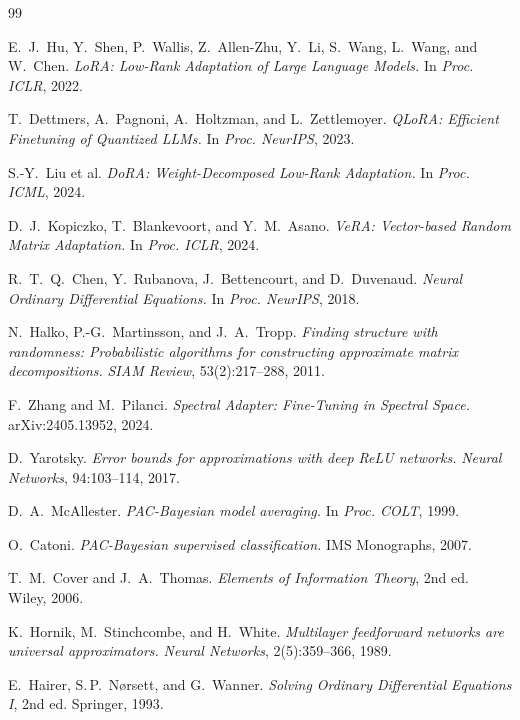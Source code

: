 \documentclass{scpe}
\begin{document}

\begin{thebibliography}{99}

E.~J.~Hu, Y.~Shen, P.~Wallis, Z.~Allen-Zhu, Y.~Li, S.~Wang, L.~Wang, and W.~Chen.
\textit{LoRA: Low-Rank Adaptation of Large Language Models.}
In \textit{Proc. ICLR}, 2022.

T.~Dettmers, A.~Pagnoni, A.~Holtzman, and L.~Zettlemoyer.
\textit{QLoRA: Efficient Finetuning of Quantized LLMs.}
In \textit{Proc. NeurIPS}, 2023.

S.-Y.~Liu et al.
\textit{DoRA: Weight-Decomposed Low-Rank Adaptation.}
In \textit{Proc. ICML}, 2024.

D.~J.~Kopiczko, T.~Blankevoort, and Y.~M.~Asano.
\textit{VeRA: Vector-based Random Matrix Adaptation.}
In \textit{Proc. ICLR}, 2024.

R.~T.~Q.~Chen, Y.~Rubanova, J.~Bettencourt, and D.~Duvenaud.
\textit{Neural Ordinary Differential Equations.}
In \textit{Proc. NeurIPS}, 2018.

N.~Halko, P.-G.~Martinsson, and J.~A.~Tropp.
\textit{Finding structure with randomness: Probabilistic algorithms for constructing approximate matrix decompositions.}
\textit{SIAM Review}, 53(2):217--288, 2011.

F.~Zhang and M.~Pilanci.
\textit{Spectral Adapter: Fine-Tuning in Spectral Space.}
arXiv:2405.13952, 2024.

D.~Yarotsky.
\textit{Error bounds for approximations with deep ReLU networks.}
\textit{Neural Networks}, 94:103--114, 2017.

D.~A.~McAllester.
\textit{PAC-Bayesian model averaging.}
In \textit{Proc. COLT}, 1999.

O.~Catoni.
\textit{PAC-Bayesian supervised classification.}
IMS Monographs, 2007.

T.~M.~Cover and J.~A.~Thomas.
\textit{Elements of Information Theory}, 2nd ed.
Wiley, 2006.

K.~Hornik, M.~Stinchcombe, and H.~White.
\textit{Multilayer feedforward networks are universal approximators.}
\textit{Neural Networks}, 2(5):359--366, 1989.

E.~Hairer, S.\,P.~N{\o}rsett, and G.~Wanner.
\textit{Solving Ordinary Differential Equations I}, 2nd ed.
Springer, 1993.


\end{thebibliography}
\end{document}
